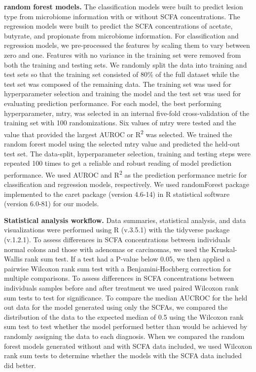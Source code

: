 \documentclass[11pt,]{article}
\begin{document}
\textbf{random forest models.} The classification models were built to
predict lesion type from microbiome information with or without SCFA
concentrations. The regression models were built to predict the SCFA
concentrations of acetate, butyrate, and propionate from microbiome
information. For classification and regression models, we pre-processed
the features by scaling them to vary between zero and one. Features with
no variance in the training set were removed from both the training and
testing sets. We randomly split the data into training and test sets so
that the training set consisted of 80\% of the full dataset while the
test set was composed of the remaining data. The training set was used
for hyperparameter selection and training the model and the test set was
used for evaluating prediction performance. For each model, the best
performing hyperparameter, mtry, was selected in an internal five-fold
cross-validation of the training set with 100 randomizations. Six values
of mtry were tested and the value that provided the largest AUROC or
R\textsuperscript{2} was selected. We trained the random forest model
using the selected mtry value and predicted the held-out test set. The
data-split, hyperparameter selection, training and testing steps were
repeated 100 times to get a reliable and robust reading of model
prediction performance. We used AUROC and R\textsuperscript{2} as the
prediction performance metric for classification and regression models,
respectively. We used randomForest package implemented to the caret
package (version 4.6-14) in R statistical software (version 6.0-81) for
our models.

\textbf{Statistical analysis workflow.} Data summaries, statistical
analysis, and data visualizations were performed using R (v.3.5.1) with
the tidyverse package (v.1.2.1). To assess differences in SCFA
concentrations between individuals normal colons and those with adenomas
or carcinomas, we used the Kruskal-Wallis rank sum test. If a test had a
P-value below 0.05, we then applied a pairwise Wilcoxon rank sum test
with a Benjamini-Hochberg correction for multiple comparisons. To assess
differences in SCFA concentrations between individuals samples before
and after treatment we used paired Wilcoxon rank sum tests to test for
significance. To compare the median AUCROC for the held out data for the
model generated using only the SCFAs, we compared the distribution of
the data to the expected median of 0.5 using the Wilcoxon rank sum test
to test whether the model performed better than would be achieved by
randomly assigning the data to each diagnosis. When we compared the
random forest models generated without and with SCFA data included, we
used Wilcoxon rank sum tests to determine whether the models with the
SCFA data included did better.
\end{document}
